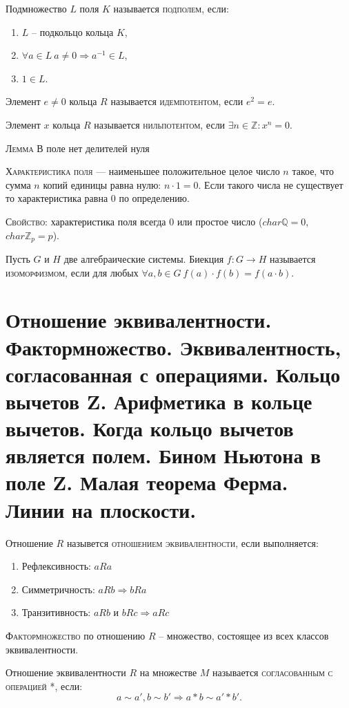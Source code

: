 \documentclass{article}
\begin{document}
Подмножество $L$ поля $K$ называется \textsc{подполем}, если:
\begin{enumerate}
    \item $L$ – подкольцо кольца $K$,
    \item $\forall a\in L\ a\neq 0\Rightarrow a^{-1}\in L$,
    \item $1\in L$.
\end{enumerate}

Элемент $e\neq 0$ кольца $R$ называется \textsc{идемпотентом}, если $e^2=e$.

Элемент $x$ кольца $R$ называется \textsc{нильпотентом}, если $\exists n\in \mathbb{Z}\colon x^n=0$.

\textsc{Лемма} В поле нет делителей нуля

\textsc{Характеристика поля} — наименьшее положительное целое число $n$ такое, что сумма $n$ копий единицы равна нулю:
$n\cdot 1=0$.
Если такого числа не существует то характеристика равна 0 по определению. 

\textsc{Свойство:} характеристика поля всегда 0 или простое число ($char \mathbb{Q}=0$, $char \mathbb{Z}_p=p$).

Пусть ${\displaystyle G\!}$ и ${\displaystyle H\!}$ две алгебраические системы. Биекция ${\displaystyle f:G\to H}$ называется \textsc{изоморфизмом}, если для любых ${\forall a,b\in G} \ {\displaystyle f(a)\cdot f(b)=f(a\cdot b).}$

\section{Отношение эквивалентности. Фактормножество. Эквивалентность, согласованная с операциями. Кольцо вычетов Z. Арифметика в кольце вычетов. Когда кольцо вычетов является полем. Бином Ньютона в поле Z. Малая теорема Ферма. Линии на плоскости.}
Отношение $R$ назывется \textsc{отношением эквивалентности}, если выполняется:
\begin{enumerate}
    \item Рефлексивность: $aRa$
    \item Симметричность: $aRb\Rightarrow bRa$
    \item Транзитивность: $aRb$ и $bRc\Rightarrow aRc$
\end{enumerate}

\textsc{Фактормножество} по отношению $R$ – множество, состоящее из всех классов эквивалентности.

Отношение эквивалентности $R$ на множестве $M$ называется \textsc{согласованным с операцией} *, если:
$$a\sim a', b\sim b' \Rightarrow a*b\sim a'*b'.$$
\end{document}

